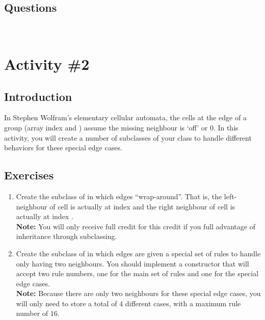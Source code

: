     \subsection{Questions}
      \ \\[9pt]

  \pagebreak

	\section{Activity \#2}
		\subsection{Introduction}
			In Stephen Wolfram's elementary cellular automata, the cells at the edge of a group (array index  and ) assume the missing neighbour is `off' or $0$. In this activity, you will create a number of subclasses of your  class to handle different behaviors for these special edge cases.

		\subsection{Exercises}
			\begin{enumerate}
				\item Create the  subclass of  in which edges ``wrap-around''. That is, the left-neighbour of cell  is actually at index  and the right neighbour of cell  is actually at index .\\
				{\small\textbf{Note:} You will only receive full credit for this credit if you full advantage of inheritance through subclassing.}
				\item Create the  subclass of  in which edges are given a special set of rules to handle only having two neighbours. You should implement a constructor that will accept two rule numbers, one for the main set of rules and one for the special edge cases.\\
				{\small\textbf{Note:} Because there are only two neighbours for these special edge cases, you will only need to store a total of $4$ different cases, with a maximum rule number of $16$.}
			\end{enumerate}

